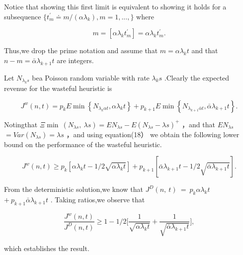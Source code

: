 Notice that showing this first limit is equivalent to showing it holds
for a subsequence
\(\{ t _ { m } ^ { \prime } \doteq m / ( \alpha \lambda _ { k } ) , m = 1 , . . . , \}\)
where

\[
m = [ \alpha \lambda _ { k } t _ { m } ^ { \prime } ] = \alpha \lambda _ { k } t _ { m } ^ { \prime } .
\]

Thus,we drop the prime notation and assume that
\(m = \alpha \lambda _ { k } t\) and that
\(n - m = \bar { \alpha } \lambda _ { k + 1 } t\) are integers.

Let \(N _ { \lambda _ { k } s }\) bea Poisson random variable with rate
\(\lambda _ { k } s\) .Clearly the expected revenue for the wasteful
heuristic is

\[
J ^ { w } ( n , t ) = p _ { k } E \operatorname* { m i n } \left\{ N _ { \lambda _ { k } \alpha t } , \alpha \lambda _ { k } t \right\} + p _ { k + 1 } E \operatorname* { m i n } \left\{ N _ { \lambda _ { k + 1 } \bar { \alpha } t } , \bar { \alpha } \lambda _ { k + 1 } t \right\} .
\]

Notingthat
\(\Xi \operatorname * { m i n } \ ( N _ { \lambda s } , \ \lambda s ) = E N _ { \lambda s } - E ( N _ { \lambda s } - \lambda s ) ^ { + }\)
，and that \(E N _ { \lambda s }\)
\(= V a r ( N _ { \lambda s } ) = \lambda s\) ，and using equation(18）
we obtain the following lower bound on the performance of the wasteful
heuristic.

\[
J ^ { w } ( n , t ) \geq p _ { k } [ \alpha \lambda _ { k } t - 1 / 2 \sqrt { \alpha \lambda _ { k } t } ] + p _ { k + 1 } [ \bar { \alpha } \lambda _ { k + 1 } t - 1 / 2 \sqrt { \bar { \alpha } \lambda _ { k + 1 } t } ] .
\]

From the deterministic solution,we know that
\(J ^ { D } ( n , \ t ) \ = \ p _ { k } \alpha \lambda _ { k } t\)
\(+ \ p _ { k + 1 } \bar { \alpha } \lambda _ { k + 1 } t\) . Taking
ratios,we observe that

\[
\frac { J ^ { w } ( n , t ) } { J ^ { D } ( n , t ) } \geq 1 - 1 / 2 \biggl [ \frac { 1 } { \sqrt { \alpha \lambda _ { k } t } } + \frac { 1 } { \sqrt { \bar { \alpha } \lambda _ { k + 1 } t } } \biggr ] ,
\]

which establishes the result.


